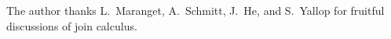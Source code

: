 \documentclass[sigplan,10pt,review,anonymous]{acmart}\settopmatter{printfolios=true}
\begin{document}
\begin{acks}                            %
  The author thanks L.~Maranget, A.~Schmitt, J.~He, and S.~Yallop for fruitful discussions of join calculus.
\end{acks}






\end{document}
